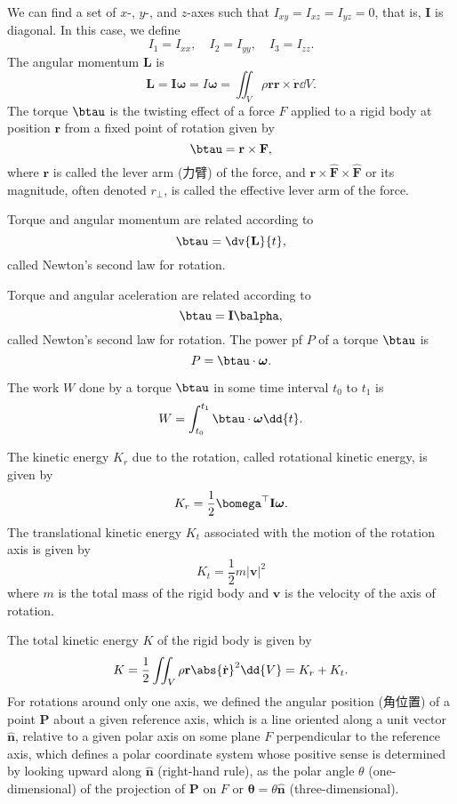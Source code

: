\documentclass[a4paper,12pt]{article}
\begin{document}
We can find a set of $x$-, $y$-, and $z$-axes such that $I_{xy}=I_{xz}=I_{yz}=0$, that is, $\mathbf{I}$ is diagonal. In this case, we define
\[I_1=I_{xx},\quad I_2=I_{yy}, \quad I_3=I_{zz}.\]
The angular momentum $\mathbf{L}$ is
\[\mathbf{L}=\mathbf{I}\boldsymbol{\omega}=I\boldsymbol{\omega}=\iint_V\rho{\mathbf{r}}\mathbf{r}\times\dot{\mathbf{r}}\dd{V}.\]
The torque $\btau$ is the twisting effect of a force $F$ applied to a rigid body at position $\mathbf{r}$ from a fixed point of rotation given by
\[\btau=\mathbf{r}\times\mathbf{F},\]
where $\mathbf{r}$ is called the lever arm (力臂) of the force, and $\mathbf{r}\times\hat{\mathbf{F}}\times\hat{\mathbf{F}}$ or its magnitude, often denoted $r_\perp$, is called the effective lever arm of the force.

Torque and angular momentum are related according to
\[\btau=\dv{\mathbf{L}}{t},\]
called Newton's second law for rotation.

Torque and angular aceleration are related according to
\[\btau=\mathbf{I}\balpha,\]
called Newton's second law for rotation.
The power pf $P$ of a torque $\btau$ is
\[P=\btau\cdot\boldsymbol{\omega}.\]

The work $W$ done by a torque $\btau$ in some time interval $t_0$ to $t_1$ is
\[W=\int_{t_0}^{t_1}\btau\cdot\boldsymbol{\omega}\dd{t}.\]

The kinetic energy $K_r$ due to the rotation, called rotational kinetic energy, is given by
\[K_r=\frac{1}{2}\bomega^\top\mathbf{I}\boldsymbol{\omega}.\]
The translational kinetic energy $K_t$ associated with the motion of the rotation axis is given by
\[K_t=\frac{1}{2}m|\mathbf{v}|^2\]
where $m$ is the total mass of the rigid body and $\mathbf{v}$ is the velocity of the axis of rotation.

The total kinetic energy $K$ of the rigid body is given by
\[K=\frac{1}{2}\iint_V\rho{\mathbf{r}}\abs{\dot{\mathbf{r}}}^2\dd{V}=K_r+K_t.\]
For rotations around only one axis, we defined the angular position (角位置) of a point $\mathbf{P}$ about a given reference axis, which is a line oriented along a unit vector $\hat{\mathbf{n}}$, relative to a given polar axis on some plane $F$ perpendicular to the reference axis, which defines a polar coordinate system whose positive sense is determined by looking upward along $\hat{\mathbf{n}}$ (right-hand rule), as the polar angle $\theta$ (one-dimensional) of the projection of $\mathbf{P}$ on $F$ or $\boldsymbol{\theta}=\theta\hat{\mathbf{n}}$ (three-dimensional).
\end{document}

